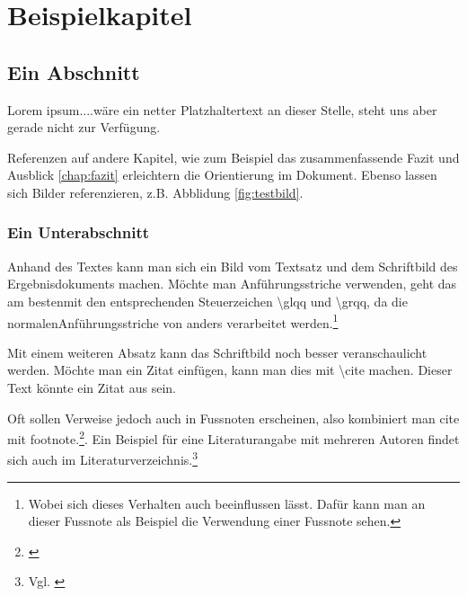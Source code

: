 \chapter{Beispielkapitel}

\section{Ein Abschnitt}

Lorem ipsum....wäre ein netter Platzhaltertext an dieser Stelle, steht uns aber gerade nicht zur Verfügung.

Referenzen auf andere Kapitel, wie zum Beispiel das zusammenfassende Fazit und Ausblick \ref{chap:fazit} erleichtern die Orientierung im Dokument. Ebenso lassen sich Bilder referenzieren, z.B. Abblidung \ref{fig:testbild}.

\subsection{Ein Unterabschnitt}

Anhand des Textes kann man sich ein Bild vom Textsatz und dem Schriftbild des Ergebnisdokuments machen. Möchte man Anführungsstriche verwenden, geht das \glqq am besten\grqq mit den entsprechenden Steuerzeichen \textbackslash glqq und \textbackslash grqq, da die \glqq normalen\grqq Anführungsstriche von \LaTeXe{} anders verarbeitet werden.\footnote{Wobei sich dieses Verhalten auch beeinflussen lässt. Dafür kann man an dieser Fussnote als Beispiel die Verwendung einer Fussnote sehen.}

Mit einem weiteren Absatz kann das Schriftbild noch besser veranschaulicht werden. Möchte man ein Zitat einfügen, kann man dies mit \textbackslash cite machen. Dieser Text könnte ein Zitat aus \cite{Demesnil.2010} sein.

Oft sollen Verweise jedoch auch in Fussnoten erscheinen, also kombiniert man cite mit footnote.\footnote{\cite{Thierry.1986}}. Ein Beispiel für eine Literaturangabe mit mehreren Autoren findet sich auch im Literaturverzeichnis.\footnote{Vgl. \cite{Berije.1981}}